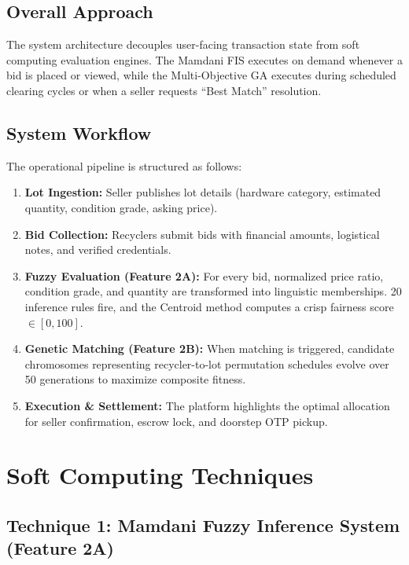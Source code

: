 \documentclass[12pt,a4paper]{article}
\begin{document}
\subsection{Overall Approach}
The system architecture decouples user-facing transaction state from soft computing evaluation engines. The Mamdani FIS executes on demand whenever a bid is placed or viewed, while the Multi-Objective GA executes during scheduled clearing cycles or when a seller requests ``Best Match'' resolution.

\subsection{System Workflow}
The operational pipeline is structured as follows:
\begin{enumerate}
    \item \textbf{Lot Ingestion:} Seller publishes lot details (hardware category, estimated quantity, condition grade, asking price).
    \item \textbf{Bid Collection:} Recyclers submit bids with financial amounts, logistical notes, and verified credentials.
    \item \textbf{Fuzzy Evaluation (Feature 2A):} For every bid, normalized price ratio, condition grade, and quantity are transformed into linguistic memberships. 20 inference rules fire, and the Centroid method computes a crisp fairness score $\in [0, 100]$.
    \item \textbf{Genetic Matching (Feature 2B):} When matching is triggered, candidate chromosomes representing recycler-to-lot permutation schedules evolve over 50 generations to maximize composite fitness.
    \item \textbf{Execution \& Settlement:} The platform highlights the optimal allocation for seller confirmation, escrow lock, and doorstep OTP pickup.
\end{enumerate}

\section{Soft Computing Techniques}

\subsection{Technique 1: Mamdani Fuzzy Inference System (Feature 2A)}
\end{document}

